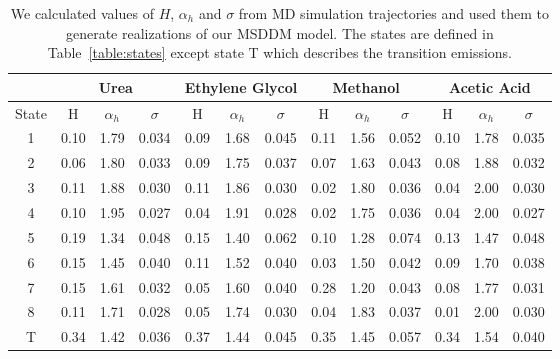 \documentclass{article}
\begin{document}
  \begin{table}[h]
  \centering
  \begin{tabular}{|c|c|c|c|c|c|c|c|c|c|c|c|c|}
  \hline
  & \multicolumn{3}{c|}{Urea} & \multicolumn{3}{c|}{Ethylene Glycol} & \multicolumn{3}{c|}{Methanol} & \multicolumn{3}{c|}{Acetic Acid} \\\hline
  State & H     &$\alpha_h$& $\sigma$ & H    &$\alpha_h$& $\sigma$   & H     &$\alpha_h$& $\sigma$ & H    &$\alpha_h$& $\sigma$ \\\hline
  1     & 0.10  & 1.79     & 0.034    & 0.09 & 1.68     & 0.045      & 0.11  & 1.56     & 0.052    & 0.10 & 1.78     & 0.035    \\
  2     & 0.06  & 1.80     & 0.033    & 0.09 & 1.75     & 0.037      & 0.07  & 1.63     & 0.043    & 0.08 & 1.88     & 0.032    \\
  3     & 0.11  & 1.88     & 0.030    & 0.11 & 1.86     & 0.030      & 0.02  & 1.80     & 0.036    & 0.04 & 2.00     & 0.030    \\
  4     & 0.10  & 1.95     & 0.027    & 0.04 & 1.91     & 0.028      & 0.02  & 1.75     & 0.036    & 0.04 & 2.00     & 0.027    \\
  5     & 0.19  & 1.34     & 0.048    & 0.15 & 1.40     & 0.062      & 0.10  & 1.28     & 0.074    & 0.13 & 1.47     & 0.048    \\
  6     & 0.15  & 1.45     & 0.040    & 0.11 & 1.52     & 0.040      & 0.03  & 1.50     & 0.042    & 0.09 & 1.70     & 0.038    \\
  7     & 0.15  & 1.61     & 0.032    & 0.05 & 1.60     & 0.040      & 0.28  & 1.20     & 0.043    & 0.08 & 1.77     & 0.031    \\
  8     & 0.11  & 1.71     & 0.028    & 0.05 & 1.74     & 0.030      & 0.04  & 1.83     & 0.037    & 0.01 & 2.00     & 0.030    \\
  T     & 0.34  & 1.42     & 0.036    & 0.37 & 1.44     & 0.045      & 0.35  & 1.45     & 0.057    & 0.34 & 1.54     & 0.040    \\\hline
  \end{tabular}
  \caption{We calculated values of $H$, $\alpha_h$ and $\sigma$ from MD simulation
  trajectories and used them to generate realizations of our MSDDM model. The states
  are defined in Table~\ref{table:states} except state T which describes the transition
  emissions.}\label{table:msddm_params}
  \end{table}
  
\end{document}

